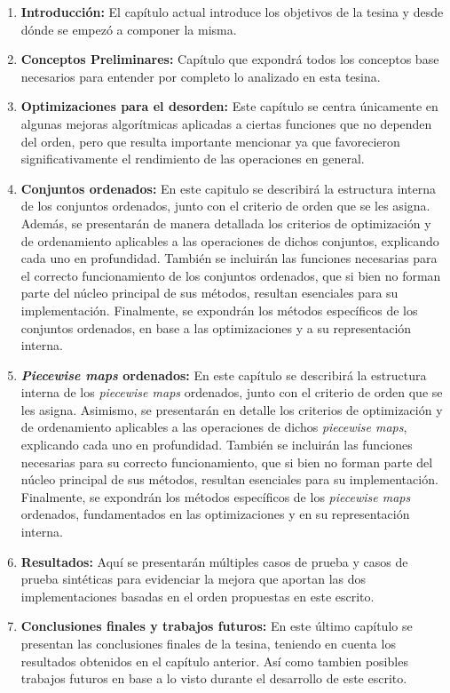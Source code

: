\begin{enumerate}
    \item \textbf{Introducción:} El capítulo actual introduce los objetivos de la tesina y desde dónde se empezó a componer la misma.
    
    \item \textbf{Conceptos Preliminares:} Capítulo que expondrá todos los conceptos base necesarios para entender por completo lo analizado en esta tesina.
    
    \item \textbf{Optimizaciones para el desorden:} Este capítulo se centra únicamente en algunas mejoras algorítmicas aplicadas a ciertas funciones que no dependen del orden, pero que resulta importante mencionar ya que favorecieron significativamente el rendimiento de las operaciones en general.
    
    \item \textbf{Conjuntos ordenados:} En este capitulo se describirá la estructura interna de los conjuntos ordenados, junto con el criterio de orden que se les asigna. Además, se presentarán de manera detallada los criterios de optimización y de ordenamiento aplicables a las operaciones de dichos conjuntos, explicando cada uno en profundidad. También se incluirán las funciones necesarias para el correcto funcionamiento de los conjuntos ordenados, que si bien no forman parte del núcleo principal de sus métodos, resultan esenciales para su implementación. Finalmente, se expondrán los métodos específicos de los conjuntos ordenados, en base a las optimizaciones y a su representación interna.


    \item \textbf{\textit{Piecewise maps} ordenados:} En este capítulo se describirá la estructura interna de los \textit{piecewise maps} ordenados, junto con el criterio de orden que se les asigna. Asimismo, se presentarán en detalle los criterios de optimización y de ordenamiento aplicables a las operaciones de dichos \textit{piecewise maps}, explicando cada uno en profundidad. También se incluirán las funciones necesarias para su correcto funcionamiento, que si bien no forman parte del núcleo principal de sus métodos, resultan esenciales para su implementación. Finalmente, se expondrán los métodos específicos de los \textit{piecewise maps} ordenados, fundamentados en las optimizaciones y en su representación interna.
    
    \item \textbf{Resultados:} Aquí se presentarán múltiples casos de prueba y casos de prueba sintéticas para evidenciar la mejora que aportan las dos implementaciones basadas en el orden propuestas en este escrito.
    
    \item \textbf{Conclusiones finales y trabajos futuros:} En este último capítulo se presentan las conclusiones finales de la tesina, teniendo en cuenta los resultados obtenidos en el capítulo anterior. Así como tambien posibles trabajos futuros en base a lo visto durante el desarrollo de este escrito.
\end{enumerate}

